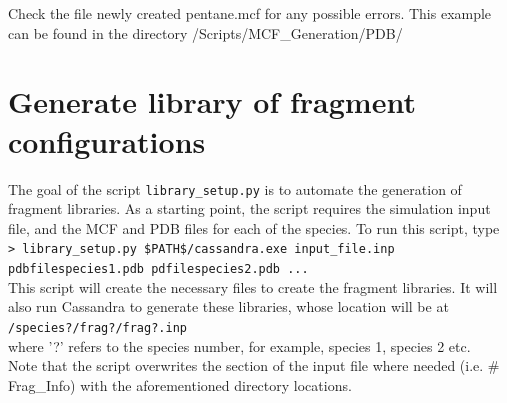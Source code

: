 Check the file newly created pentane.mcf for any possible errors. This example can be found in the directory 
/Scripts/MCF\_Generation/PDB/

\section{Generate library of fragment configurations}
\label{sec:libgen}

The goal of the script \texttt{library\_setup.py} is to automate the generation of fragment libraries.
As a starting point, the script requires the simulation input file, and the MCF and PDB 
files for each of the species. To run this script, type \\

\texttt{> library\_setup.py \$PATH\$/cassandra.exe input\_file.inp pdbfilespecies1.pdb pdfilespecies2.pdb ...} \\

This script will create the necessary files to create the fragment libraries. It will also run Cassandra 
to generate these libraries, whose location will be at \\

\texttt{/species?/frag?/frag?.inp} \\

where '?' refers to the species number, for example, species 1, species 2 etc. \\

Note that the script overwrites the section of the input file where 
needed (i.e. \# Frag\_Info) with the aforementioned directory locations.
